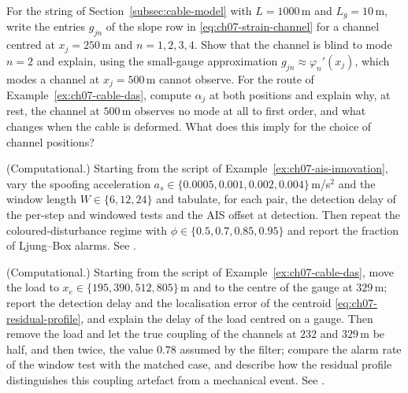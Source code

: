 \begin{prob}\label{prob:ch07:5}
For the string of Section~\ref{subsec:cable-model} with $L=1000$\,m and $L_g=10$\,m, write the entries $g_{jn}$ of the slope row in \eqref{eq:ch07-strain-channel} for a channel centred at $x_j=250$\,m and $n=1,2,3,4$. Show that the channel is blind to mode $n=2$ and explain, using the small-gauge approximation $g_{jn}\approx\varphi_n'(x_j)$, which modes a channel at $x_j=500$\,m cannot observe. For the route of Example~\ref{ex:ch07-cable-das}, compute $\alpha_j$ at both positions and explain why, at rest, the channel at $500$\,m observes no mode at all to first order, and what changes when the cable is deformed. What does this imply for the choice of channel positions?
\end{prob}
\begin{prob}\label{prob:ch07:6}
(Computational.) Starting from the script of Example~\ref{ex:ch07-ais-innovation}, vary the spoofing acceleration $a_s\in\{0.0005,0.001,0.002,0.004\}$\,m/s$^{2}$ and the window length $W\in\{6,12,24\}$ and tabulate, for each pair, the detection delay of the per-step and windowed tests and the AIS offset at detection. Then repeat the coloured-disturbance regime with $\phi\in\{0.5,0.7,0.85,0.95\}$ and report the fraction of Ljung--Box alarms. See .
\end{prob}
\begin{prob}\label{prob:ch07:7}
(Computational.) Starting from the script of Example~\ref{ex:ch07-cable-das}, move the load to $x_e\in\{195,390,512,805\}$\,m and to the centre of the gauge at $329$\,m; report the detection delay and the localisation error of the centroid \eqref{eq:ch07-residual-profile}, and explain the delay of the load centred on a gauge. Then remove the load and let the true coupling of the channels at $232$ and $329$\,m be half, and then twice, the value $0.78$ assumed by the filter; compare the alarm rate of the window test with the matched case, and describe how the residual profile distinguishes this coupling artefact from a mechanical event. See .
\end{prob}
